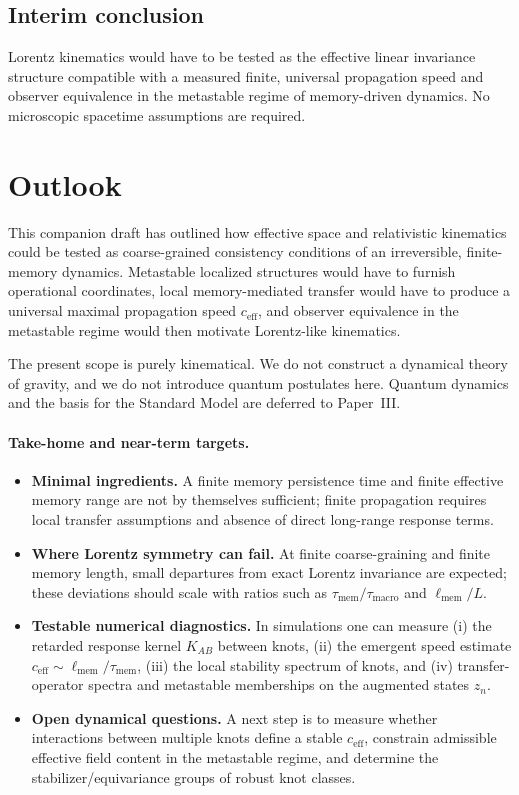 \documentclass[reprint,amsmath,amssymb,aps,prl,nofootinbib,floatfix]{revtex4-2}
\begin{document}
\subsection{Interim conclusion}
Lorentz kinematics would have to be tested as the effective linear invariance structure compatible with a measured finite, universal propagation speed and observer equivalence in the metastable regime of memory-driven dynamics.
No microscopic spacetime assumptions are required.

\section{Outlook}\label{sec:outlook}

This companion draft has outlined how effective space and relativistic kinematics could be tested as coarse-grained consistency conditions of an irreversible, finite-memory dynamics. Metastable localized structures would have to furnish operational coordinates, local memory-mediated transfer would have to produce a universal maximal propagation speed $c_{\mathrm{eff}}$, and observer equivalence in the metastable regime would then motivate Lorentz-like kinematics.

The present scope is purely kinematical. We do not construct a dynamical theory of gravity, and we do not introduce quantum postulates here. Quantum dynamics and the basis for the Standard Model are deferred to Paper~III.

\paragraph{Take-home and near-term targets.}
\begin{itemize}
\item \textbf{Minimal ingredients.} A finite memory persistence time and finite effective memory range are not by themselves sufficient; finite propagation requires local transfer assumptions and absence of direct long-range response terms.
\item \textbf{Where Lorentz symmetry can fail.} At finite coarse-graining and finite memory length, small departures from exact Lorentz invariance are expected; these deviations should scale with ratios such as $\tau_{\mathrm{mem}}/\tau_{\mathrm{macro}}$ and $\ell_{\mathrm{mem}}/L$.
\item \textbf{Testable numerical diagnostics.} In simulations one can measure (i) the retarded response kernel $K_{AB}$ between knots, (ii) the emergent speed estimate $c_{\mathrm{eff}}\sim \ell_{\mathrm{mem}}/\tau_{\mathrm{mem}}$, (iii) the local stability spectrum of knots, and (iv) transfer-operator spectra and metastable memberships on the augmented states $z_n$.
\item \textbf{Open dynamical questions.} A next step is to measure whether interactions between multiple knots define a stable $c_{\mathrm{eff}}$, constrain admissible effective field content in the metastable regime, and determine the stabilizer/equivariance groups of robust knot classes.
\end{itemize}



\end{document}
